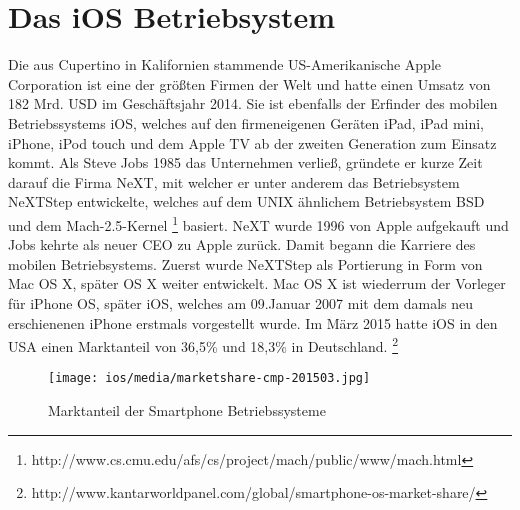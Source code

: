 \section{Das iOS Betriebsystem}
	Die aus Cupertino in Kalifornien stammende US-Amerikanische Apple Corporation
	ist eine der größten Firmen der Welt und hatte einen Umsatz von 182 Mrd.
	USD im Geschäftsjahr 2014. Sie ist ebenfalls der Erfinder des mobilen
	Betriebssystems iOS, welches auf den firmeneigenen Geräten iPad, iPad mini,
	iPhone, iPod touch und dem Apple TV ab der zweiten Generation zum Einsatz
	kommt. Als Steve Jobs 1985 das Unternehmen verließ, gründete er
	kurze Zeit darauf die Firma NeXT, mit welcher er unter anderem das
	Betriebsystem NeXTStep entwickelte, welches auf dem UNIX ähnlichem
	Betriebsystem BSD\cite[S.12]{Tanenbaum2009} und dem	Mach-2.5-Kernel
	\footnote{http://www.cs.cmu.edu/afs/cs/project/mach/public/www/mach.html}
	basiert. NeXT wurde 1996 von Apple aufgekauft und Jobs kehrte als neuer CEO zu
	Apple zurück. Damit begann die Karriere des mobilen Betriebsystems. Zuerst
	wurde NeXTStep als Portierung in Form von Mac OS X, später OS X weiter
	entwickelt. Mac OS X ist wiederrum der Vorleger für iPhone OS, später iOS,
	welches am 09.Januar 2007 mit dem damals neu erschienenen iPhone erstmals
	vorgestellt wurde. Im März 2015 hatte iOS in den USA einen Marktanteil von
	36,5\% und 18,3\% in Deutschland.
	\footnote{http://www.kantarworldpanel.com/global/smartphone-os-market-share/}\\
	
	\begin{figure}[h]
		\centering
		\texttt{[image: ios/media/marketshare-cmp-201503.jpg]}
		\caption{Marktanteil der Smartphone Betriebssysteme
		\cite{MobileOsStat}}
		\label{fig:marcetshare}
	\end{figure}